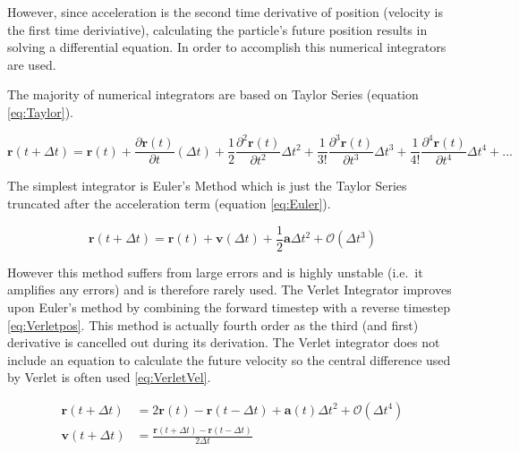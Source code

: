 \message{ !name(main.tex)}\documentclass[12pt]{UoAthesis}
\begin{document}
However, since acceleration is the second time derivative of position
(velocity is the first time deriviative), calculating the particle's
future position results in solving a differential equation. In order
to accomplish this numerical integrators are used.

The majority of numerical integrators are based on Taylor Series
(equation \ref{eq:Taylor}).

\begin{equation} 
\mathbf{r}(t+\Delta t) = \mathbf{r}(t) + 
\frac{\partial\mathbf{r}(t)}{\partial t}(\Delta t) + 
\frac{1}{2}\frac{\partial^2\mathbf{r}(t)}{\partial t^2}\Delta t^2 + 
\frac{1}{3!}\frac{\partial^3\mathbf{r}(t)}{\partial t^3}\Delta t^3 
+ \frac{1}{4!}\frac{\partial^4\mathbf{r}(t)}{\partial t^4}\Delta t^4 
+ ... \label{eq:Taylor} 
\end{equation}

The simplest integrator is Euler's Method which is just the Taylor
Series truncated after the acceleration term (equation
\ref{eq:Euler}).

\begin{equation} 
  \mathbf{r}(t+\Delta t) = \mathbf{r}(t) + \mathbf{v}(\Delta t) +
  \frac{1}{2}\mathbf{a}\Delta t^2 + \mathcal{O}(\Delta t^3) 
  \label{eq:Euler}
\end{equation}

However this method suffers from large errors and is highly unstable
(i.e.\ it amplifies any errors) \cite{Haile1997} and is therefore rarely
used. The Verlet Integrator \cite{Verlet1967} improves upon Euler's
method by combining the forward timestep with a reverse timestep
\eqref{eq:Verletpos}. This method is actually fourth order as the
third (and first) derivative is cancelled out during its
derivation. The Verlet integrator does not include an equation to
calculate the future velocity so the central difference used by Verlet
is often used \eqref{eq:VerletVel}.

\begin{subequations} 
  \begin{align} 
    \mathbf{r}(t + \Delta t) &= 2\mathbf{r}(t) - \mathbf{r}(t - \Delta t) 
    + \mathbf{a}(t)\Delta t^2 + \mathcal{O}(\Delta t^4)
    \label{eq:Verletpos} \\
    \mathbf{v}(t+\Delta t) &= \frac{\mathbf{r}(t+\Delta t) -
      \mathbf{r}(t-\Delta t)}{2\Delta t} 
    \label{eq:VerletVel} 
  \end{align}
\end{subequations}
\end{document}
